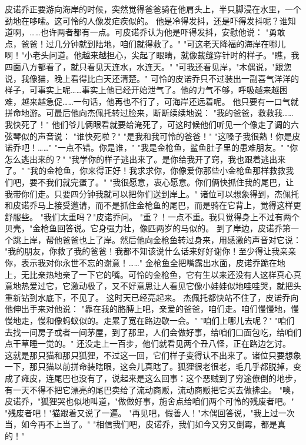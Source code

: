 \documentclass[12pt,UTF8]{ctexbook}
\begin{document}
皮诺乔正要游向海岸的时候，突然觉得爸爸骑在他肩头上，半只脚浸在水里，一个劲地在哆嗦。这可怜的人像发疟疾似的。
他是冷得发抖，还是吓得发抖呢？谁知道啊，……也许两者都有一点。可皮诺乔认为他是吓得发抖，安慰他说：
"勇敢点，爸爸！过几分钟就到陆地，咱们就得救了。"
"可这老天降福的海岸在哪儿啊！"小老头问道。他越来越担心，尖起了眼睛，就像裁缝穿针时的样子。"瞧，我四面八方都看了，就只看见天连水，水连天。"
"可我还看见岸，"木偶说，"跟您说，我像猫，晚上看得比白天还清楚。"
可怜的皮诺乔只不过装出一副喜气洋洋的样子，可事实上呢……事实上他已经开始泄气了。他的力气不够，呼吸越来越困难，越来越急促……一句话，他再也不行了，可海岸还远着呢。
他只要有一口气就拼命地游。可最后他向杰佩托转过脸来，断断续续地说：
"我的爸爸，救救我……我快死了！"
他们爷儿俩眼看就要给淹死了，可这时候他们听见一个像走了调的六弦琴似的声音说：
"谁快死啦？"
"是我和我可怜的爸爸！"
"这嗓子我很熟！你是皮诺乔吧！……"
"一点不错。你是谁，"
"我是金枪鱼，鲨鱼肚子里的患难朋友。"
"你怎么逃出来的？"
"我学你的样子逃出来了。是你给我开了窍，我也跟着逃出来了。"
"我的金枪鱼，你来得正好！我求求你，你像爱你那些小金枪鱼那样救救我们吧，要不我们就完蛋了。"
"我很愿意，衷心愿意。你们俩快抓住我的尾巴，让我带你们走。只要四分钟我就可以把你们送到岸上。"
诸位可以想象得到，杰佩托和皮诺乔马上接受邀请，而不是抓住金枪鱼的尾巴，而是骑在它背上，觉得这样更舒服些。
"我们太重吗？"皮诺乔问。
"重？！一点不重。我只觉得身上不过有两个贝壳，"金枪鱼回答说。它身强力壮，像匹两岁的马似的。
到了岸边，皮诺乔第一个跳上岸，帮他爸爸也上了岸。然后他向金枪鱼转过身来，用感激的声音对它说：
"我的朋友，你救了我的爸爸！我都不知该说什么话来好好谢你！至少得让我亲亲你，表示我对你永世不忘的谢意！……"
金枪鱼全把嘴露出水面，皮诺乔跪在地上，无比亲热地亲了一下它的嘴。可怜的金枪鱼，它有生以来还没有人这样真心真意地热爱过它，它激动极了，又不好意思让人看见它像小娃娃似地哇哇哭，就把头重新钻到水底下，不见了。
这时天已经亮起来。
杰佩托都快站不住了，皮诺乔向他伸出手来对他说：
"靠在我的胳膊上吧，亲爱的爸爸，咱们走。咱们慢慢地，慢慢地走，慢和像蚂蚁似的。走累了宽在路边歇一会。"
"咱们上哪儿去呢？"
"咱们去找一间房子或者一间茅屋，到了那里，人们会做好事，给咱们口面包吃，给咱们点干草睡一觉的。"
还没走上一百步，他们就看见两个丑八怪，正在路边乞讨。
这就是那只猫和那只狐狸，不过这一回，它们样子变得认不出来了。诸位只要想象一下，那只猫以前拼命装瞎眼，这会儿真瞎了。狐狸很老很老，毛几乎都脱掉，变成了瘫皮，连尾巴也没有了，说起来是这么回事：这个恶贼到了穷途僚倒的地步，有一天不得不把它漂亮的尾巴卖给了流动商贩，流动商贩把它买去做拂尘。
"噢，皮诺乔，"狐狸哭也似地叫道，"做做好事，施舍点给咱们两个可怜的残废者吧。"
"残废者吧！"猫跟着又说了一遍。
"再见吧，假善人！"木偶回答说，"我上过一次当，如今再不上当了。"
"相信我们吧，皮诺乔，我们如今又穷又倒霉，都是真的！"
\end{document}

